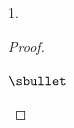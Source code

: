 \documentclass[11pt]{article}%
\begin{document}
\begin{noliste}{1.}
\begin{proof}
\begin{noliste}{$\sbullet$}
          
        
          
          
            
            

\end{noliste}
\end{proof}
\end{noliste}
\end{document}
